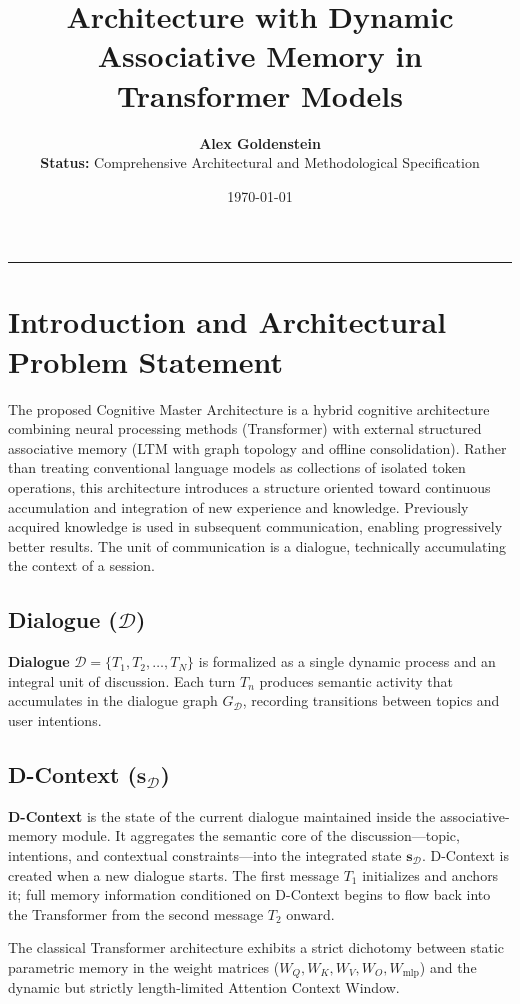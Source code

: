\documentclass[11pt,a4paper]{article}
\title{\textbf{\Large \color{primarycolor} Architecture with Dynamic Associative Memory in Transformer Models}}
\author{\Large \textbf{Alex Goldenstein} \\ \vspace{0.3cm} \normalsize \textbf{Status:} Comprehensive Architectural and Methodological Specification}
\date{\today}
\begin{document}
\RaggedRight
\maketitle
\hrule
\vspace{0.5cm}

\section{Introduction and Architectural Problem Statement}

The proposed Cognitive Master Architecture is a hybrid cognitive architecture combining neural processing methods (Transformer) with external structured associative memory (LTM with graph topology and offline consolidation). Rather than treating conventional language models as collections of isolated token operations, this architecture introduces a structure oriented toward continuous accumulation and integration of new experience and knowledge. Previously acquired knowledge is used in subsequent communication, enabling progressively better results. The unit of communication is a dialogue, technically accumulating the context of a session.

\subsection*{Dialogue ($\mathcal{D}$)}
\textbf{Dialogue} $\mathcal{D}=\{T_1,T_2,\dots,T_N\}$ is formalized as a single dynamic process and an integral unit of discussion. Each turn $T_n$ produces semantic activity that accumulates in the dialogue graph $G_{\mathcal{D}}$, recording transitions between topics and user intentions.

\subsection*{D-Context ($\mathbf{s}_{\mathcal{D}}$)}
\textbf{D-Context} is the state of the current dialogue maintained inside the associative-memory module. It aggregates the semantic core of the discussion---topic, intentions, and contextual constraints---into the integrated state $\mathbf{s}_{\mathcal{D}}$. D-Context is created when a new dialogue starts. The first message $T_1$ initializes and anchors it; full memory information conditioned on D-Context begins to flow back into the Transformer from the second message $T_2$ onward.

The classical Transformer architecture exhibits a strict dichotomy between static parametric memory in the weight matrices ($W_Q,W_K,W_V,W_O,W_{\text{mlp}}$) and the dynamic but strictly length-limited Attention Context Window.
\end{document}
